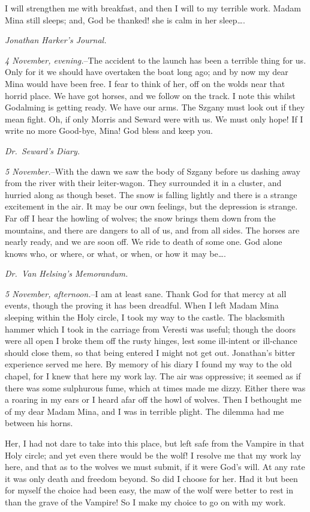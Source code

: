 \documentclass[12pt,openright]{book}
\begin{document}
I will strengthen me with breakfast, and then I will to my terrible work. Madam Mina still sleeps; and, God be thanked! she is calm in her sleep….

\textit{Jonathan Harker’s Journal.}

\textit{4 November, evening.}–The accident to the launch has been a terrible thing for us. Only for it we should have overtaken the boat long ago; and by now my dear Mina would have been free. I fear to think of her, off on the wolds near that horrid place. We have got horses, and we follow on the track. I note this whilst Godalming is getting ready. We have our arms. The Szgany must look out if they mean fight. Oh, if only Morris and Seward were with us. We must only hope! If I write no more Good-bye, Mina! God bless and keep you.

\textit{Dr. Seward’s Diary.}

\textit{5 November.}–With the dawn we saw the body of Szgany before us dashing away from the river with their leiter-wagon. They surrounded it in a cluster, and hurried along as though beset. The snow is falling lightly and there is a strange excitement in the air. It may be our own feelings, but the depression is strange. Far off I hear the howling of wolves; the snow brings them down from the mountains, and there are dangers to all of us, and from all sides. The horses are nearly ready, and we are soon off. We ride to death of some one. God alone knows who, or where, or what, or when, or how it may be….

\textit{Dr. Van Helsing’s Memorandum.}

\textit{5 November, afternoon.}–I am at least sane. Thank God for that mercy at all events, though the proving it has been dreadful. When I left Madam Mina sleeping within the Holy circle, I took my way to the castle. The blacksmith hammer which I took in the carriage from Veresti was useful; though the doors were all open I broke them off the rusty hinges, lest some ill-intent or ill-chance should close them, so that being entered I might not get out. Jonathan’s bitter experience served me here. By memory of his diary I found my way to the old chapel, for I knew that here my work lay. The air was oppressive; it seemed as if there was some sulphurous fume, which at times made me dizzy. Either there was a roaring in my ears or I heard afar off the howl of wolves. Then I bethought me of my dear Madam Mina, and I was in terrible plight. The dilemma had me between his horns.

Her, I had not dare to take into this place, but left safe from the Vampire in that Holy circle; and yet even there would be the wolf! I resolve me that my work lay here, and that as to the wolves we must submit, if it were God’s will. At any rate it was only death and freedom beyond. So did I choose for her. Had it but been for myself the choice had been easy, the maw of the wolf were better to rest in than the grave of the Vampire! So I make my choice to go on with my work.
\end{document}
